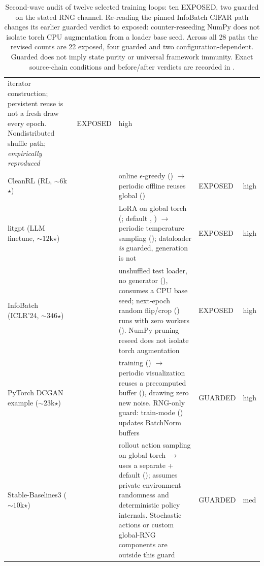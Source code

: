 \begin{table}[tbp]
\begin{tabular}{@{}L{2.15cm}L{1.2cm}L{8.3cm}L{1.7cm}L{1.0cm}@{}}
iterator construction; persistent reuse is not a fresh draw every epoch.
Nondistributed shuffle path; \emph{empirically reproduced} & EXPOSED & high \\
\addlinespace
CleanRL (RL, ${\sim}6$k$\star$) &  &
online $\epsilon$-greedy  (\allowbreak{})
$\to$ periodic offline  reuses global 
() & EXPOSED & high \\
\addlinespace
litgpt (LLM finetune, ${\sim}12$k$\star$) &  &
LoRA  on global torch (; default
, ) $\to$
periodic  temperature sampling
 (); dataloader \emph{is}
guarded, generation is not & EXPOSED & high \\
\addlinespace
InfoBatch (ICLR'24, ${\sim}346$$\star$) &  &
unshuffled test loader, no generator
(), consumes a CPU base seed;
next-epoch random flip/crop () runs with zero workers
(). NumPy pruning reseed does not isolate torch augmentation
& EXPOSED & high \\
\addlinespace
PyTorch DCGAN example (${\sim}23$k$\star$) &  &
training  () $\to$ periodic
visualization reuses a precomputed  buffer
(), drawing zero new noise. RNG-only guard: train-mode
 () updates BatchNorm buffers & GUARDED & high \\
\addlinespace
Stable-Baselines3 (${\sim}10$k$\star$) &  &
rollout action sampling on global torch $\to$ 
uses a separate  +  default
(); assumes private environment randomness and
deterministic policy internals. Stochastic actions or custom global-RNG
components are outside this guard &
GUARDED & med \\
\bottomrule
\end{tabular}
\caption{Second-wave audit of twelve selected training loops: ten EXPOSED,
two guarded on the stated RNG channel. Re-reading the pinned InfoBatch
CIFAR path changes its earlier guarded verdict to exposed: counter-reseeding
NumPy does not isolate torch CPU augmentation from a loader base seed.
Across all 28 paths the revised counts are 22 exposed, four guarded and
two configuration-dependent. Guarded does not imply state purity or
universal framework immunity. Exact source-chain conditions and before/after
verdicts are recorded in .}
\label{tab:fieldwide}
\end{table}

